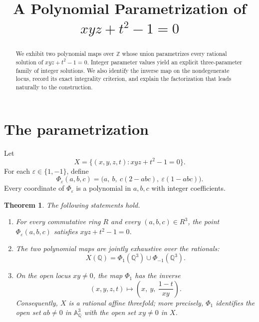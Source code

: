 \documentclass[11pt]{article}
\title{A Polynomial Parametrization of\texorpdfstring{\\[2mm]
\(xyz+t^2-1=0\)}{ xyz+t^2-1=0}}
\author{}
\date{}
\newtheorem{theorem}{Theorem}
\theoremstyle{remark}
\newcommand{\Z}{\mathbb Z}
\newcommand{\Q}{\mathbb Q}
\newcommand{\A}{\mathbb A}
\begin{document}
\maketitle
\vspace{-2.2em}

\begin{abstract}
We exhibit two polynomial maps over \(\Z\) whose union parametrizes every
rational solution of \(xyz+t^2-1=0\).  Integer parameter values yield an
explicit three-parameter family of integer solutions.  We also identify the
inverse map on the nondegenerate locus, record its exact integrality criterion,
and explain the factorization that leads naturally to the construction.
\end{abstract}

\section{The parametrization}

Let
\[
X=\bigl\{(x,y,z,t): xyz+t^2-1=0\bigr\}.
\]
For each \(\varepsilon\in\{1,-1\}\), define
\[
\Phi_{\varepsilon}(a,b,c)
 =\bigl(a,\ b,\ c(2-abc),\ \varepsilon(1-abc)\bigr).
\]
Every coordinate of \(\Phi_\varepsilon\) is a polynomial in \(a,b,c\)
with integer coefficients.

\begin{theorem}\label{thm:main}
The following statements hold.
\begin{enumerate}
    \item For every commutative ring \(R\) and every \((a,b,c)\in R^3\),
    the point \(\Phi_\varepsilon(a,b,c)\) satisfies
    \(xyz+t^2-1=0\).

    \item The two polynomial maps are jointly exhaustive over the rationals:
    \[
       X(\Q)=\Phi_{1}(\Q^3)\cup\Phi_{-1}(\Q^3).
    \]

    \item On the open locus \(xy\ne0\), the map \(\Phi_1\) has the inverse
    \[
       (x,y,z,t)\longmapsto
       \left(x,\ y,\ \frac{1-t}{xy}\right).
    \]
    Consequently, \(X\) is a rational affine threefold; more precisely,
    \(\Phi_1\) identifies the open set \(ab\ne0\) in \(\A^3_\Q\) with the
    open set \(xy\ne0\) in \(X\).
\end{enumerate}
\end{theorem}
\end{document}
